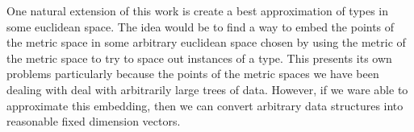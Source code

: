 One natural extension of this work is create a best approximation of types in some euclidean space.
The idea would be to find a way to embed the points of the metric space in some arbitrary euclidean space chosen 
by using the metric of the metric space to try to space out instances of a type.
This presents its own problems particularly because the points of the metric spaces we have been dealing with 
deal with arbitrarily large trees of data.
However, if we ware able to approximate this embedding,
then we can convert arbitrary data structures into reasonable fixed dimension vectors.